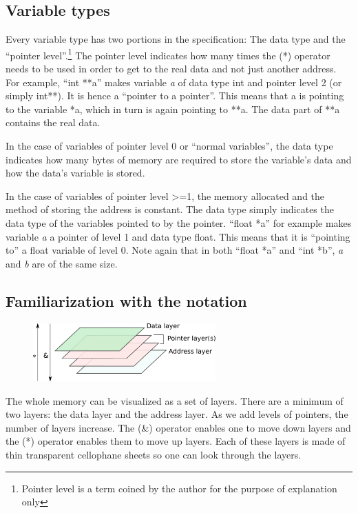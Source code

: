 \documentclass[10pt,twoside]{article}
\begin{document}
\subsection*{Variable types} Every variable type has two portions in the
specification: The data type and the ``pointer level''.\footnote{Pointer level
is a term coined by the author for the purpose of explanation only} The pointer
level indicates how many times the (*) operator needs to be used in order to get
to the real data and not just another address. For example, ``int **a'' makes
variable \textit{a} of data type int and pointer level 2 (or simply int**). It
is hence a ``pointer to a pointer''. This means that a is pointing to the
variable *a, which in turn is again pointing to **a. The data part of **a
contains the real data.

In the case of variables of pointer level 0 or ``normal variables'', the data
type indicates how many bytes of memory are required to store the variable's
data and how the data's variable is stored.

In the case of variables of pointer level {\textgreater}=1, the memory allocated
and the method of storing the address is constant. The data type simply
indicates the data type of the variables pointed to by the pointer. ``float *a''
for example makes variable \textit{a }\textup{a pointer of level 1 and data type
float. This means that it is ``pointing to'' a float variable of level 0. Note
again that in both ``float *a'' and ``int *b'', }\textit{a}\textup{ and
}\textit{b }\textup{are of the same size.} \newpage \subsection*{Familiarization
with the notation}

\begin{figure}
\includegraphics[width=70mm]{res/layer-splitup.pdf}
\end{figure}

The whole memory can be visualized as a set of layers. There are a minimum of
two layers: the data layer and the address layer. As we add levels of pointers,
the number of layers increase. The (\&) operator enables one to move down layers
and the (*) operator enables them to move up layers. Each of these layers is
made of thin transparent cellophane sheets so one can look through the layers.
\end{document}
